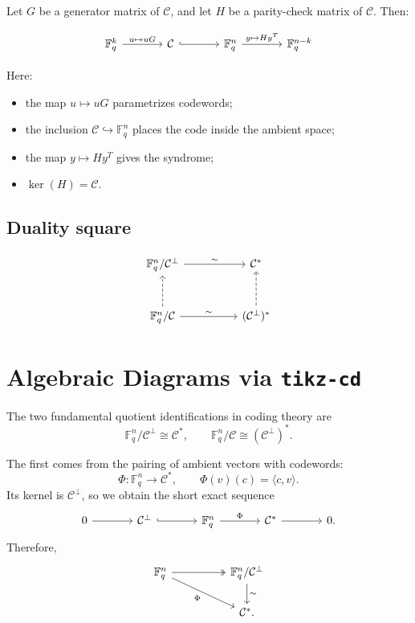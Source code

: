\documentclass[11pt]{article}
\theoremstyle{remark}
\newcommand{\F}{\mathbb{F}}
\newcommand{\C}{\mathcal{C}}
\begin{document}
	Let \(G\) be a generator matrix of \(\C\), and let \(H\) be a parity-check matrix of \(\C\). Then:
	
	\[
	\begin{tikzcd}[column sep=large, row sep=large]
		\F_q^k \arrow[r, "u \mapsto uG"] & \C \arrow[r, hook] & \F_q^n \arrow[r, "y \mapsto Hy^T"] & \F_q^{n-k}
	\end{tikzcd}
	\]
	
	Here:
	
	\begin{itemize}
		\item the map \(u \mapsto uG\) parametrizes codewords;
		\item the inclusion \(\C \hookrightarrow \F_q^n\) places the code inside the ambient space;
		\item the map \(y \mapsto Hy^T\) gives the syndrome;
		\item \(\ker(H)=\C\).
	\end{itemize}

	\newpage
	\subsection{Duality square}
	
	\[
	\begin{tikzcd}[row sep=large, column sep=huge]
		\F_q^n/\C^\perp \arrow[r, "\sim"] & \C^* \\
		\F_q^n/\C \arrow[r, "\sim"] \arrow[u, dashed] & (\C^\perp)^* \arrow[u, dashed]
	\end{tikzcd}
	\]
	
	\section{Algebraic Diagrams via \texttt{tikz-cd}}
	
	The two fundamental quotient identifications in coding theory are
	\[
	\F_q^n/\C^\perp \cong \C^*,
	\qquad
	\F_q^n/\C \cong (\C^\perp)^*.
	\]
	
	The first comes from the pairing of ambient vectors with codewords:
	\[
	\Phi:\F_q^n\to \C^*,\qquad \Phi(v)(c)=\langle c,v\rangle.
	\]
	Its kernel is \(\C^\perp\), so we obtain the short exact sequence
	\[
	\begin{tikzcd}[column sep=large]
		0 \arrow[r] & \C^\perp \arrow[r, hook] & \F_q^n \arrow[r, "\Phi"] & \C^* \arrow[r] & 0.
	\end{tikzcd}
	\]
	Therefore,
	\[
	\begin{tikzcd}[column sep=huge]
		\F_q^n \arrow[r, two heads] \arrow[dr, "\Phi"'] & \F_q^n/\C^\perp \arrow[d, "\sim"] \\
		& \C^*.
	\end{tikzcd}
	\]
	
\end{document}
